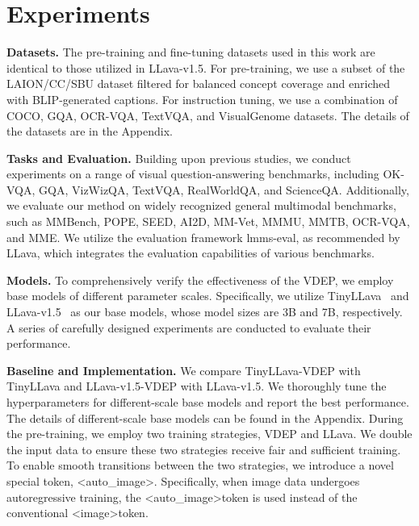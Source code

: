 \section{Experiments}
\label{experments}


\textbf{Datasets.}
The pre-training and fine-tuning datasets used in this work are identical to those utilized in LLava-v1.5.
For pre-training, we use a subset of the LAION/CC/SBU dataset filtered for balanced concept coverage and enriched with BLIP-generated captions. 
For instruction tuning, we use a combination of COCO\cite{lin2014microsoft}, GQA\cite{hudson2019gqa}, OCR-VQA\cite{mishra2019ocr}, TextVQA\cite{singh2019towards}, and VisualGenome\cite{krishna2017visual} datasets. The details of the datasets are in the Appendix. 

\textbf{Tasks and Evaluation.}
Building upon previous studies, we conduct experiments on a range of visual question-answering benchmarks, including OK-VQA\cite{marino2019ok}, GQA\cite{hudson2019gqa}, VizWizQA\cite{Bigham_Jayant_Ji_Little_Miller_Miller_Tatarowicz_White_White_Yeh_2010}, TextVQA\cite{singh2019towards}, RealWorldQA\cite{grok15v}, and ScienceQA\cite{lu2022learn}. Additionally, we evaluate our method on widely recognized general multimodal benchmarks, such as MMBench\cite{liu2025mmbench}, POPE\cite{li2023evaluating}, SEED\cite{li2023seed}, AI2D\cite{kembhavi2016diagram}, MM-Vet\cite{yu2023mm}, MMMU\cite{yue2024mmmu}, MMTB\cite{ying2024mmt}, OCR-VQA\cite{mishra2019ocr}, and MME\cite{fu2024mmecomprehensiveevaluationbenchmark}. We utilize the evaluation framework lmms-eval\cite{zhang2024lmmsevalrealitycheckevaluation, lmms_eval2024}, as recommended by LLava, which integrates the evaluation capabilities of various benchmarks.


\textbf{Models.} To comprehensively verify the effectiveness of the VDEP, we employ base models of different parameter scales. Specifically, we utilize TinyLLava~\cite{zhou2024TinyLLava} and LLava-v1.5~\cite{liu2024improved} as our base models, whose model sizes are 3B and 7B, respectively. A series of carefully designed experiments are conducted to evaluate their performance.

\textbf{Baseline and Implementation.} 
We compare TinyLLava-VDEP with TinyLLava and LLava-v1.5-VDEP with LLava-v1.5. We thoroughly tune the hyperparameters for different-scale base models and report the best performance. The details of different-scale base models can be found in the Appendix. During the pre-training, we employ two training strategies, VDEP and LLava. We double the input data to ensure these two strategies receive fair and sufficient training. 
To enable smooth transitions between the two strategies, we introduce a novel special token, \textless auto\_image\textgreater. Specifically, when image data undergoes autoregressive training, the \textless auto\_image\textgreater  token is used instead of the conventional \textless image\textgreater  token. 

